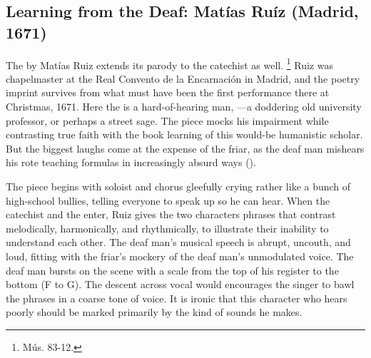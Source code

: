 \subsection{Learning from the Deaf: Matías Ruíz (Madrid, 1671)}

The  by Matías Ruiz extends its parody to the catechist as well.%
\footnote{\signature{E-E}{Mús. 83-12}.}
Ruiz was chapelmaster at the Real Convento de la Encarnación in Madrid, and the poetry imprint survives from what must have been the first performance there at Christmas, 1671.%
\autocite{1671-Madrid-Enc-Nav}
Here the  is a hard-of-hearing man, ---a doddering old university professor, or perhaps a street sage.
The piece mocks his impairment while contrasting true faith with the book learning of this would-be humanistic scholar.
But the biggest laughs come at the expense of the friar, as the deaf man mishears his rote teaching formulas in increasingly absurd ways ().


The piece begins with soloist and chorus gleefully crying   rather like a bunch of high-school bullies, telling everyone to speak up so he can hear.
When the catechist and the  enter, Ruiz gives the two characters phrases that contrast melodically, harmonically, and rhythmically, to illustrate their inability to understand each other.
The deaf man's musical speech is abrupt, uncouth, and loud, fitting with the friar's mockery of the deaf man's unmodulated voice.
The deaf man bursts on the scene with a scale from the top of his register to the bottom (F to G).
The descent across vocal  would encourages the singer to bawl the phrases in a coarse tone of voice.
It is ironic that this character who hears poorly should be marked primarily by the kind of sounds he makes.


